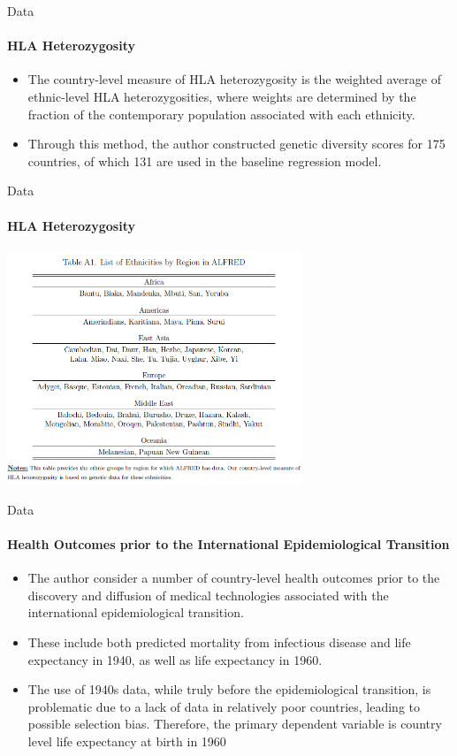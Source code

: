 \documentclass[pdftex,12pt,xcolor=pdftex,table]{beamer}
\theoremstyle{definition}
\theoremstyle{remark}
\numberwithin{equation}{section}
\numberwithin{figure}{section}
\begin{document}
\begin{frame}{Data}
\framesubtitle{HLA Heterozygosity}
\justifying

\begin{itemize}
\item The country-level measure of HLA heterozygosity is the weighted average of ethnic-level HLA heterozygosities, where weights are determined by the fraction of the contemporary population associated with each ethnicity.
\pause
\item Through this method, the author constructed genetic diversity scores for 175 countries, of which 131 are used in the baseline regression model. 
\end{itemize}
\end{frame}

\begin{frame}{Data}
\framesubtitle{HLA Heterozygosity}
\includegraphics[height=7cm]{Appendix_1.PNG}
\centering
\end{frame}

\begin{frame}{Data}
\framesubtitle{Health Outcomes prior to the International Epidemiological Transition}
\justifying
\begin{itemize}
\item The author consider a number of country-level health outcomes prior to the discovery and diffusion of medical technologies associated with the international epidemiological transition.
\pause
\item These include both predicted mortality from infectious disease and life expectancy in 1940, as well as life expectancy in 1960.
\pause
\item The use of 1940s data, while truly before the epidemiological transition, is problematic due to a lack of data in relatively poor countries, leading to possible selection bias. Therefore, the primary dependent variable is country level life expectancy at birth in 1960

\end{itemize}
\end{frame}
\end{document}
